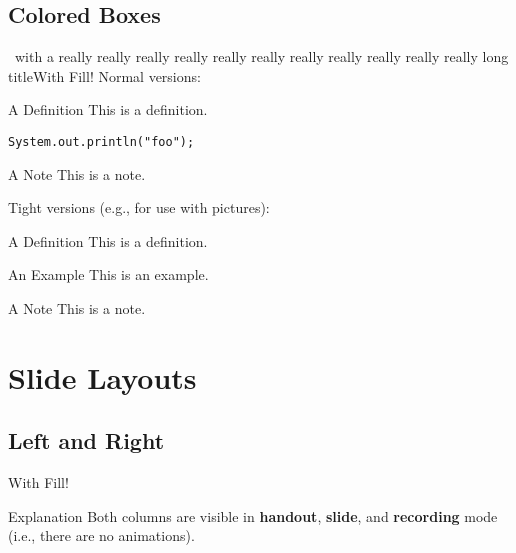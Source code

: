 \documentclass[
	aspectratio=169, %
	8pt, %
	english, %
]{beamer}
\begin{document}
\subsection{Colored Boxes}
\begin{frame}[fragile]{\insertsubsection\ with a really really really really really really really really really really really long title\hfill With Fill!}
	Normal versions:

\begin{leftmiddleandright}
		\begin{definition}{A Definition}
			This is a definition.
\begin{verbatim}
System.out.println("foo");
\end{verbatim}
		\end{definition}
\next
\next
		\begin{note}{A Note}
			This is a note.
		\end{note}
\end{leftmiddleandright}
	\vfill

	Tight versions (e.g., for use with pictures):

\begin{leftmiddleandright}
		\begin{definitiontight}{A Definition}
			This is a definition.
		\end{definitiontight}
\next
		\begin{exampletight}{An Example}
			This is an example.
		\end{exampletight}
\next
		\begin{notetight}{A Note}
			This is a note.
		\end{notetight}
\end{leftmiddleandright}
\end{frame}

\section{Slide Layouts}

\subsection{Left and Right}
\begin{frame}{\insertsubsection\hfill With Fill!}
	\vfill
	\begin{note}{Explanation}
		Both columns are visible in \textbf{handout}, \textbf{slide}, and \textbf{recording} mode (i.e., there are no animations).
	\end{note}
\end{frame}
\end{document}

